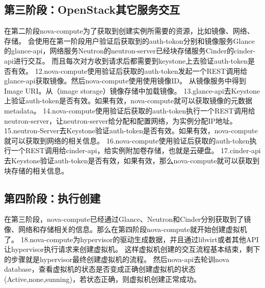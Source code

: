 \documentclass[a4paper,left=1.5cm,right=1.5cm,11pt]{article}
\begin{document}
\subsection{第三阶段：OpenStack其它服务交互}
在第二阶段nova-compute为了获取到创建实例所需要的资源，比如镜像、网络、存储。
会使用在第一阶段用户验证后获取到的auth-tokon分别和镜像服务Glance的glance-api，网络服务Neutron的neutron-server已经块存储服务Cinder的cinder-api进行交互。
而且每次对方收到请求后都需要到keystone上去验证auth-token是否有效。
12.nova-compute使用验证后获取的auth-token发起一个REST调用给glance-api获取镜像。然后nova-compute使用使用镜像ID。
从镜像服务中得到Image URI。从（image storage）镜像存储中加载镜像。
13.glance-api去Keystone上验证auth-token是否有效。如果有效，nova-compute就可以获取镜像的元数据metadata。
14.nova-compute使用验证后获取的auth-token执行一个REST调用给neutron-server，让neutron-server给分配和配置网络，为实例分配IP地址。
15.neutron-Server去Keystone验证auth-token是否有效。如果有效，nova-compute就可以获取到网络的相关信息。
16.nova-compute使用验证后获取的auth-token执行一个REST调用给cinder-api，给实例附加卷存储，也就是云硬盘。
17.cinder-api去Keystone验证auth-token是否有效，如果有效，那么nova-compute就可以获取到块存储的相关信息。

\subsection{第四阶段：执行创建}
在第三阶段，nova-compute已经通过Glance、Neutron和Cinder分别获取到了镜像、网络和存储相关的信息。那么在第四阶段nova-compute就开始创建虚拟机了。
18.nova-compute为hypervisor的驱动生成数据，并且通过libvirt或者其他API让hypervisor执行请求来创建虚拟机。
这样虚拟机创建的交互流程基本结束，剩下的步骤就是hypervisor最终创建虚拟机的流程。
然后nova-api去轮训nova database，查看虚拟机的状态是否变成正确创建虚拟机的状态(Active,none,sunning)，若状态正确，则虚拟机创建正常成功。
	
\end{document}
